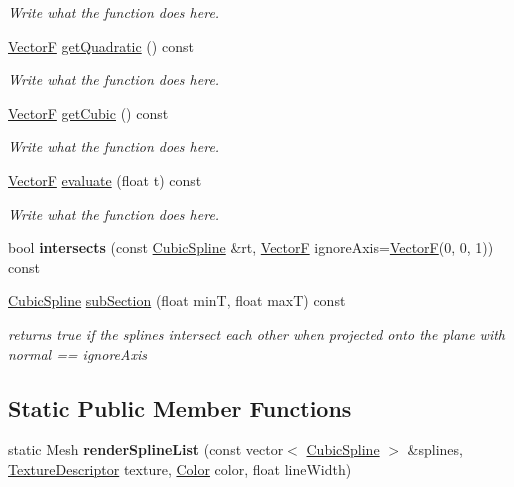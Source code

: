 \begin{DoxyCompactItemize}
\begin{DoxyCompactList}\small\item\em Write what the function does here. \end{DoxyCompactList}\item 
\hyperlink{structVectorF}{Vector\+F} \hyperlink{structCubicSpline_a7d5792ff1314032122cd342d0616a50f}{get\+Quadratic} () const 
\begin{DoxyCompactList}\small\item\em Write what the function does here. \end{DoxyCompactList}\item 
\hyperlink{structVectorF}{Vector\+F} \hyperlink{structCubicSpline_a156525e59dae0cac2a81cf34cb673c87}{get\+Cubic} () const 
\begin{DoxyCompactList}\small\item\em Write what the function does here. \end{DoxyCompactList}\item 
\hyperlink{structVectorF}{Vector\+F} \hyperlink{structCubicSpline_a6b5d7cf704ce35a9bce93d6faf53a4fe}{evaluate} (float t) const 
\begin{DoxyCompactList}\small\item\em Write what the function does here. \end{DoxyCompactList}\item 
\hypertarget{structCubicSpline_a17f53f7cb9b49caa80eff66097b57145}{bool {\bfseries intersects} (const \hyperlink{structCubicSpline}{Cubic\+Spline} \&rt, \hyperlink{structVectorF}{Vector\+F} ignore\+Axis=\hyperlink{structVectorF}{Vector\+F}(0, 0, 1)) const }\label{structCubicSpline_a17f53f7cb9b49caa80eff66097b57145}

\item 
\hyperlink{structCubicSpline}{Cubic\+Spline} \hyperlink{structCubicSpline_a9af4ede47352f7d8d38b520632b2bf3d}{sub\+Section} (float min\+T, float max\+T) const 
\begin{DoxyCompactList}\small\item\em returns true if the splines intersect each other when projected onto the plane with normal == ignore\+Axis \end{DoxyCompactList}\end{DoxyCompactItemize}
\subsection*{Static Public Member Functions}
\begin{DoxyCompactItemize}
\item 
\hypertarget{structCubicSpline_ab4f44a0380e5834289a60957baeaf822}{static Mesh {\bfseries render\+Spline\+List} (const vector$<$ \hyperlink{structCubicSpline}{Cubic\+Spline} $>$ \&splines, \hyperlink{structTextureDescriptor}{Texture\+Descriptor} texture, \hyperlink{structColor}{Color} color, float line\+Width)}\label{structCubicSpline_ab4f44a0380e5834289a60957baeaf822}

\end{DoxyCompactItemize}
